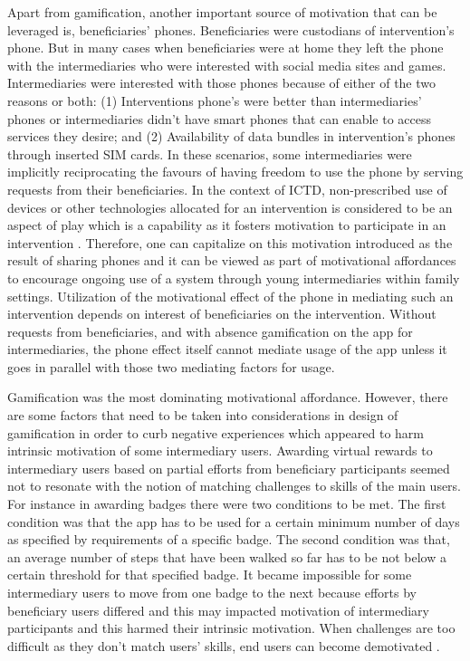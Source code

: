 Apart from gamification, another important source of motivation that can be leveraged is, beneficiaries' phones. Beneficiaries were custodians of intervention's phone. But in many cases when beneficiaries were at home they left the phone with the intermediaries who were interested with social media sites and  games. Intermediaries were interested with those phones because of either of the two reasons or both: (1) Interventions phone's were better than intermediaries' phones or intermediaries didn't have smart phones that can enable to access services they desire; and (2) Availability of data bundles in intervention's phones through inserted SIM cards. In these scenarios, some intermediaries were implicitly reciprocating the favours of having freedom to use the phone by serving requests from their beneficiaries. In the context of ICTD, non-prescribed use of devices or other technologies allocated for an intervention is considered to be an aspect of play which is a capability as it fosters motivation to participate in an intervention \citep{ferrplay2015}. Therefore, one can capitalize on this motivation introduced as the result of sharing phones and it can be viewed as part of motivational affordances to encourage ongoing use of a system through young intermediaries within family settings. Utilization of the motivational effect of the phone in mediating such an intervention depends on interest of beneficiaries on the intervention. Without requests from beneficiaries, and with absence gamification on the app for intermediaries, the phone effect itself cannot mediate usage of the app unless it goes in parallel with those two mediating factors for usage.

Gamification was the most dominating motivational affordance. However, there are some factors that need to be taken into considerations in design of gamification in order to curb negative experiences which appeared to harm intrinsic motivation of some intermediary users. Awarding virtual rewards to intermediary users based on partial efforts from beneficiary participants seemed not to resonate with the notion of matching challenges to skills of the main users. For instance in awarding badges there were two conditions to be met. The first condition was that the app has to be used for a certain minimum number of days as specified by requirements of a specific badge. The second condition was that, an average number of steps that have been walked so far has to be not below a certain threshold for that specified badge. It became impossible for some intermediary users to move from one badge to the next because efforts by beneficiary users differed and this may impacted motivation of intermediary participants and this harmed their intrinsic motivation. When challenges are too difficult as they don't match users' skills, end users can become demotivated \citep{zhang2008motivational}. 

